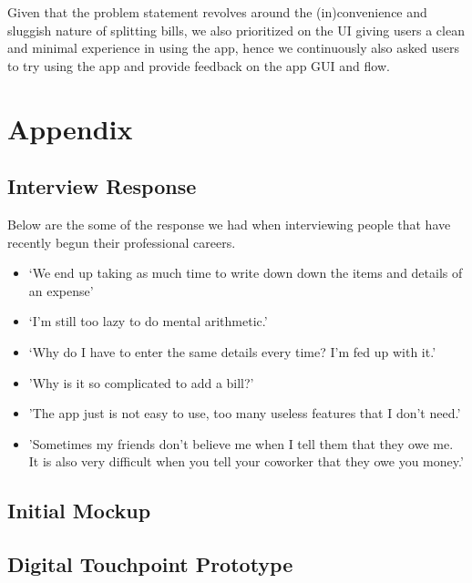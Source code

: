 \documentclass[a4wide, 10pt]{article}
\begin{document}
Given that the problem statement revolves around the (in)convenience and sluggish nature of splitting bills, we also prioritized on the UI giving users a clean and minimal experience in using the app, hence we continuously also asked users to try using the app and provide feedback on the app GUI and flow.


\newpage
\section{Appendix}

\subsection{Interview Response}
\label{intRes}
Below are the some of the response we had when interviewing people that have recently begun their professional careers.

\begin{itemize}
  \item ‘We end up taking as much time to write down down the items and details of an expense’
  \item ‘I’m still too lazy to do mental arithmetic.’
  \item ‘Why do I have to enter the same details every time? I'm fed up with it.’
  \item 'Why is it so complicated to add a bill?'
  \item 'The app just is not easy to use, too many useless features that I don't need.'
  \item 'Sometimes my friends don't believe me when I tell them that they owe me. It is also very difficult when you tell your coworker that they owe you money.'
\end{itemize}

\subsection{Initial Mockup}
\vspace{-3ex}
\label{mockup}

\subsection{Digital Touchpoint Prototype}
\label{dtp}

\end{document}
